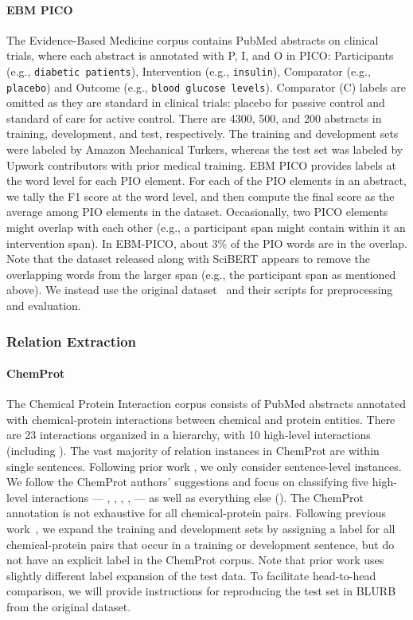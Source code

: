 \documentclass[acmlarge,screen,nonacm]{acmart}
\begin{document}
\paragraph{EBM PICO} The Evidence-Based Medicine corpus \cite{nye2018corpus} contains PubMed abstracts on clinical trials, where each abstract is annotated with P, I, and O in PICO: Participants (e.g., \texttt{diabetic patients}), Intervention (e.g., \texttt{insulin}), Comparator (e.g., \texttt{placebo}) and Outcome (e.g., \texttt{blood glucose levels}). Comparator (C) labels are omitted as they are standard in clinical trials: placebo for passive control and standard of care for active control. There are 4300, 500, and 200 abstracts in training, development, and test, respectively. 
The training and development sets were labeled by Amazon Mechanical Turkers, whereas the test set was labeled by Upwork contributors with prior medical training. EBM PICO provides labels at the word level for each PIO element. For each of the PIO elements in an abstract, we tally the F1 score at the word level, and then compute the final score as the average among PIO elements in the dataset. Occasionally, two PICO elements might overlap with each other (e.g., a participant span might contain within it an intervention span). In EBM-PICO, about 3\% of the PIO words are in the overlap. Note that the dataset released along with SciBERT appears to remove the overlapping words from the larger span (e.g., the participant span as mentioned above). We instead use the original dataset~\cite{nye2018corpus} and their scripts for preprocessing and evaluation.

\subsubsection{Relation Extraction}
\paragraph{ChemProt} The Chemical Protein Interaction corpus \cite{krallinger2017overview} consists of PubMed abstracts annotated with chemical-protein interactions between chemical and protein entities. There are 23 interactions organized in a hierarchy, with 10 high-level interactions (including ). 
The vast majority of relation instances in ChemProt are within single sentences. Following prior work \cite{lee2019bioberts,beltagy2019scibert}, we only consider sentence-level instances. 
We follow the ChemProt authors' suggestions and focus on classifying five high-level interactions --- , , , ,  --- as well as everything else ().
The ChemProt annotation is not exhaustive for all chemical-protein pairs.
Following previous work~\cite{peng2019transfer,lee2019bioberts}, we expand the training and development sets by assigning a  label for all chemical-protein pairs that occur in a training or development sentence, but do not have an explicit label in the ChemProt corpus. 
Note that prior work uses slightly different label expansion of the test data. To facilitate head-to-head comparison, we will provide instructions for reproducing the test set in BLURB from the original dataset.
\end{document}

